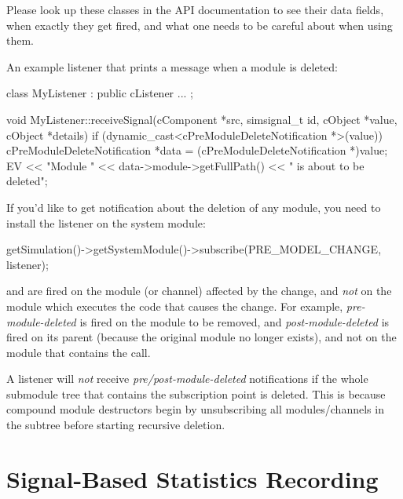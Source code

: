 \begin{ned}
\begin{note}
  Please look up these classes in the API documentation to see their data fields,
  when exactly they get fired, and what one needs to be careful about when using them.
\end{note}

An example listener that prints a message when a module is deleted:

\begin{cpp}
class MyListener : public cListener
{
   ...
};

void MyListener::receiveSignal(cComponent *src, simsignal_t id, cObject *value,
                               cObject *details)
{
    if (dynamic_cast<cPreModuleDeleteNotification *>(value)) {
        cPreModuleDeleteNotification *data = (cPreModuleDeleteNotification *)value;
        EV << "Module " << data->module->getFullPath() << " is about to be deleted\n";
    }
}
\end{cpp}

If you'd like to get notification about the deletion of any module, you need
to install the listener on the system module:

\begin{cpp}
getSimulation()->getSystemModule()->subscribe(PRE_MODEL_CHANGE, listener);
\end{cpp}

\begin{note}
   and  are fired on the
  module (or channel) affected by the change, and \textit{not} on the module
  which executes the code that causes the change. For example,
  \textit{pre-module-deleted} is fired on the module to be removed, and
  \textit{post-module-deleted} is fired on its parent (because the original
  module no longer exists), and not on the module that contains the
   call.
\end{note}

\begin{note}
  A listener will \textit{not} receive \textit{pre/post-module-deleted}
  notifications if the whole submodule tree that contains the subscription
  point is deleted. This is because compound module destructors begin
  by unsubscribing all modules/channels in the subtree before starting
  recursive deletion.
\end{note}


\section{Signal-Based Statistics Recording}
\label{sec:simple-modules:signal-based-statistics}


\end{ned}
